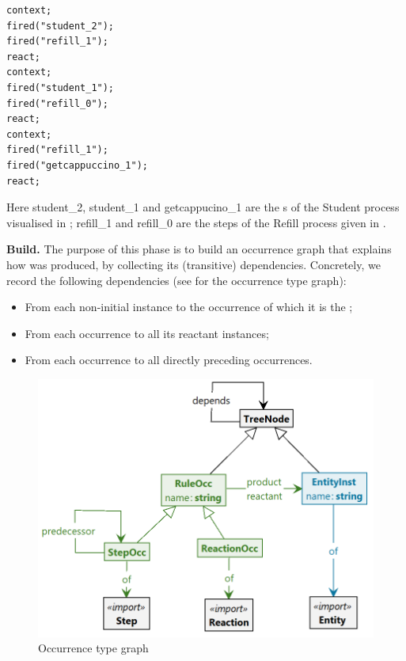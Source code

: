 \begin{center}
\begin{lstlisting}
context;
fired("student_2");
fired("refill_1");
react;
context;
fired("student_1");
fired("refill_0");
react;
context;
fired("refill_1");
fired("getcappuccino_1");
react;
\end{lstlisting}
\end{center}
%
Here \textsf{student\_2}, \textsf{student\_1} and \textsf{getcappucino\_1} are the \Step{}s of the \textsf{Student} process visualised in ; \textsf{refill\_1} and \textsf{refill\_0} are the steps of the \textsf{Refill} process given in .

\medskip\noindent\textbf{Build.}
%
The purpose of this phase is to build an occurrence graph that explains how \Forbidden was produced, by collecting its (transitive) dependencies. Concretely, we record the following dependencies (see  for the occurrence type graph):
\begin{itemize}
\item From each non-initial \Entity instance to the \Rule occurrence of which it is the \product;
\item From each \Rule occurrence to all its reactant \Entity instances;
\item From each \Step occurrence to all directly preceding \Step occurrences.
\end{itemize}
%
\begin{figure}
\centering
\includegraphics[scale=.2]{figs/occur-type}
\caption{Occurrence type graph}
\label{fig:occur-type}
\end{figure}
